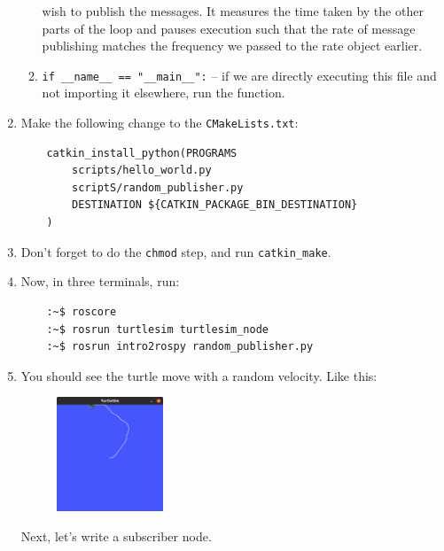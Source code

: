 \documentclass{article}
\begin{document}
\begin{enumerate}
\begin{enumerate}
            wish to publish the messages. It measures the time taken by the other parts of the 
            loop and pauses execution such that the rate of message publishing matches the 
            frequency we passed to the rate object earlier.
            \item \texttt{if __name__ == "__main__":} -- if we are directly executing
            this file and not importing it elsewhere, run the function.
        \end{enumerate}
        \item Make the following change to the \texttt{CMakeLists.txt}:
        \begin{verbatim}
    catkin_install_python(PROGRAMS
        scripts/hello_world.py
        scriptS/random_publisher.py
        DESTINATION ${CATKIN_PACKAGE_BIN_DESTINATION}
    )
        \end{verbatim}
        \item Don't forget to do the \texttt{chmod} step, and run \texttt{catkin\_make}.
        \item Now, in three terminals, run:
        \begin{verbatim}
    :~$ roscore
    :~$ rosrun turtlesim turtlesim_node 
    :~$ rosrun intro2rospy random_publisher.py
        \end{verbatim}
        \item You should see the turtle move with a random velocity. Like this:
        \begin{figure}[H]
            \center
            \includegraphics[width = 0.3\textwidth]{turtle.png}
        \end{figure}
        Next, let's write a subscriber node.
    \end{enumerate}
    \newpage
\end{document}
